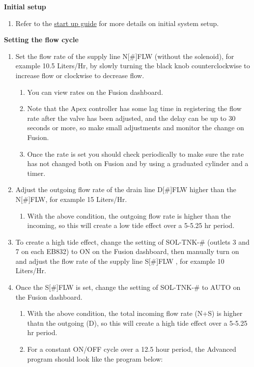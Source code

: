 \documentclass[
]{book}
\providecommand{\tightlist}{%
  \setlength{\itemsep}{0pt}\setlength{\parskip}{0pt}}
\begin{document}
\textbf{Initial setup}

\begin{enumerate}
\def\labelenumi{\arabic{enumi}.}
\tightlist
\item
  Refer to the \href{05-start-up_guide.rmd/\#Overflow_into_Secondary_Sump}{start up guide} for more details on initial system setup.
\end{enumerate}

\textbf{Setting the flow cycle}

\begin{enumerate}
\def\labelenumi{\arabic{enumi}.}
\tightlist
\item
  Set the flow rate of the supply line N{[}\#{]}FLW (without the solenoid), for example 10.5 Liters/Hr, by slowly turning the black knob counterclockwise to increase flow or clockwise to decrease flow.

  \begin{enumerate}
  \def\labelenumii{\arabic{enumii}.}
  \tightlist
  \item
    You can view rates on the Fusion dashboard.
  \item
    Note that the Apex controller has some lag time in registering the flow rate after the valve has been adjusted, and the delay can be up to 30 seconds or more, so make small adjustments and monitor the change on Fusion.
  \item
    Once the rate is set you should check periodically to make sure the rate has not changed both on Fusion and by using a graduated cylinder and a timer.
  \end{enumerate}
\item
  Adjust the outgoing flow rate of the drain line D{[}\#{]}FLW higher than the N{[}\#{]}FLW, for example 15 Liters/Hr.

  \begin{enumerate}
  \def\labelenumii{\arabic{enumii}.}
  \tightlist
  \item
    With the above condition, the outgoing flow rate is higher than the incoming, so this will create a low tide effect over a 5-5.25 hr period.
  \end{enumerate}
\item
  To create a high tide effect, change the setting of SOL-TNK-\# (outlets 3 and 7 on each EB832) to ON on the Fusion dashboard, then manually turn on and adjust the flow rate of the supply line S{[}\#{]}FLW , for example 10 Liters/Hr.\\
\item
  Once the S{[}\#{]}FLW is set, change the setting of SOL-TNK-\# to AUTO on the Fusion dashboard.

  \begin{enumerate}
  \def\labelenumii{\arabic{enumii}.}
  \tightlist
  \item
    With the above condition, the total incoming flow rate (N+S) is higher thatn the outgoing (D), so this will create a high tide effect over a 5-5.25 hr period.
  \item
    For a constant ON/OFF cycle over a 12.5 hour period, the Advanced program should look like the program below:
  \end{enumerate}
\end{enumerate}
\end{document}
